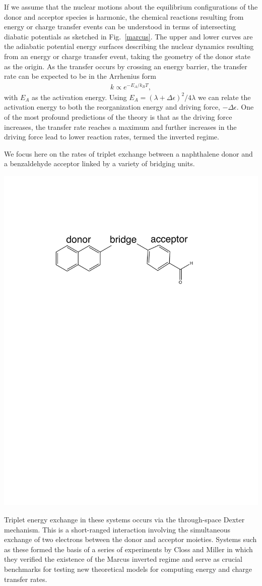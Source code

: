 If we assume that the nuclear motions about the equilibrium configurations of the
donor and acceptor species is harmonic,  the chemical reactions resulting from
energy or charge transfer events can be understood in terms of intersecting
diabatic potentials as sketched in Fig.~\ref{marcus}.    The upper and lower
curves are the adiabatic potential energy surfaces describing the nuclear dynamics
resulting from an energy or charge transfer event, taking the geometry of the donor
state as the origin.
As the transfer occurs by crossing an energy barrier,
the transfer rate can be expected to be in the Arrhenius form
\begin{eqnarray}
k\propto e^{-E_{A}/k_{B}T},
\end{eqnarray}
with $E_{A}$ as the activation energy.
 Using $E_{A}={(\lambda+\Delta \epsilon)^{2}}/{4\lambda}$
 we can relate the activation energy to both the reorganization energy and driving force, $-\Delta \epsilon$.
One of the most profound predictions of the theory is that  as the driving force increases,
the transfer rate reaches a maximum and further increases in the driving force
lead to lower reaction rates, termed the inverted regime.



We focus here on the rates of triplet exchange between a naphthalene donor and a benzaldehyde acceptor linked by a variety of bridging units.
\begin{center}
\includegraphics[width=0.50\columnwidth]{Chapters/chap2/Scheme1}
\end{center}
Triplet energy exchange in these systems occurs via the through-space Dexter mechanism\cite{Dexter:1952}.
This is a short-ranged interaction involving the simultaneous exchange of two electrons between the
donor and acceptor moieties.
Systems such as these formed the basis of a series of experiments by  Closs and Miller\cite{miller1984intramolecular}
in which they verified the existence of the Marcus inverted regime
and serve as crucial benchmarks for testing new theoretical models for computing
energy and charge transfer rates\cite{subotnik2008constructing,subotnik2009initial,Subotnik:2010}.


